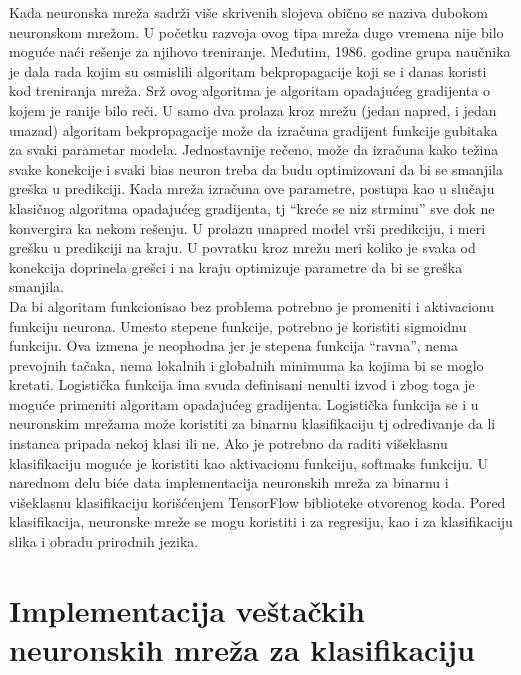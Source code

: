 \documentclass[a4paper,12pt]{report}
\begin{document}
Kada neuronska mreža sadrži više skrivenih slojeva obično se naziva dubokom neuronskom mrežom. U početku razvoja ovog tipa mreža dugo vremena nije bilo moguće naći rešenje za njihovo treniranje. Međutim, 1986. godine grupa naučnika je dala rada kojim su osmislili algoritam bekpropagacije koji se i danas koristi kod treniranja mreža. Srž ovog algoritma je algoritam opadajućeg gradijenta o kojem je ranije bilo reči. U samo dva prolaza kroz mrežu (jedan napred, i jedan unazad) algoritam bekpropagacije može da izračuna gradijent funkcije gubitaka za svaki parametar modela. Jednostavnije rečeno, može da izračuna kako težina svake konekcije i svaki bias neuron treba da budu optimizovani da bi se smanjila greška u predikciji. Kada mreža izračuna ove parametre, postupa kao u slučaju klasičnog algoritma opadajućeg gradijenta, tj \enquote{kreće se niz strminu} sve dok ne konvergira ka nekom rešenju. U prolazu unapred model vrši predikciju, i meri grešku u predikciji na kraju. U povratku kroz mrežu meri koliko je svaka od konekcija doprinela grešci i na kraju optimizuje parametre da bi se greška smanjila. \\

Da bi algoritam funkcionisao bez problema potrebno je promeniti i aktivacionu funkciju neurona. Umesto stepene funkcije, potrebno je koristiti sigmoidnu funkciju. Ova izmena je neophodna jer je stepena funkcija \enquote{ravna}, nema prevojnih tačaka, nema lokalnih i globalnih minimuma ka kojima bi se moglo kretati. Logistička funkcija ima svuda definisani nenulti izvod i zbog toga je moguće primeniti algoritam opadajućeg gradijenta. Logistička funkcija se i u neuronskim mrežama može koristiti za binarnu klasifikaciju tj određivanje da li instanca pripada nekoj klasi ili ne. Ako je potrebno da raditi višeklasnu klasifikaciju moguće je koristiti kao aktivacionu funkciju, softmaks funkciju. U narednom delu biće data implementacija neuronskih mreža za binarnu i višeklasnu klasifikaciju korišćenjem TensorFlow biblioteke otvorenog koda. Pored klasifikacija, neuronske mreže se mogu koristiti i za regresiju, kao i za klasifikaciju slika i obradu prirodnih jezika. \\

 \section{Implementacija veštačkih neuronskih mreža za klasifikaciju}
\end{document}
